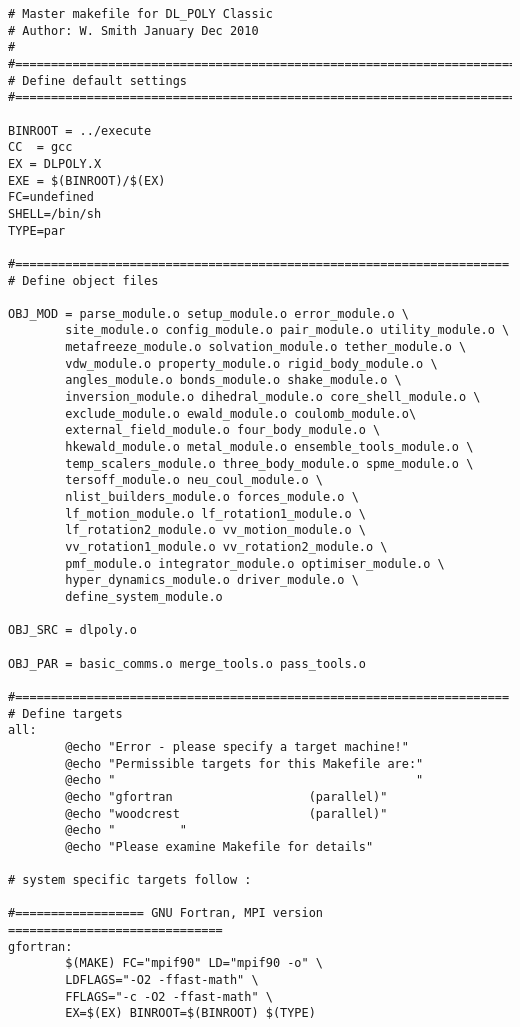 
\label{A1}
\begin{verbatim}
# Master makefile for DL_POLY Classic
# Author: W. Smith January Dec 2010
# 
#=======================================================================
# Define default settings
#=======================================================================

BINROOT = ../execute
CC  = gcc
EX = DLPOLY.X
EXE = $(BINROOT)/$(EX)
FC=undefined
SHELL=/bin/sh
TYPE=par

#=====================================================================
# Define object files

OBJ_MOD = parse_module.o setup_module.o error_module.o \
        site_module.o config_module.o pair_module.o utility_module.o \
        metafreeze_module.o solvation_module.o tether_module.o \
        vdw_module.o property_module.o rigid_body_module.o \
        angles_module.o bonds_module.o shake_module.o \
        inversion_module.o dihedral_module.o core_shell_module.o \
        exclude_module.o ewald_module.o coulomb_module.o\
        external_field_module.o four_body_module.o \
        hkewald_module.o metal_module.o ensemble_tools_module.o \
        temp_scalers_module.o three_body_module.o spme_module.o \
        tersoff_module.o neu_coul_module.o \
        nlist_builders_module.o forces_module.o \
        lf_motion_module.o lf_rotation1_module.o \
        lf_rotation2_module.o vv_motion_module.o \
        vv_rotation1_module.o vv_rotation2_module.o \
        pmf_module.o integrator_module.o optimiser_module.o \
        hyper_dynamics_module.o driver_module.o \
        define_system_module.o

OBJ_SRC = dlpoly.o

OBJ_PAR = basic_comms.o merge_tools.o pass_tools.o

#=====================================================================
# Define targets
all:
        @echo "Error - please specify a target machine!"
        @echo "Permissible targets for this Makefile are:"
        @echo "                                          "
        @echo "gfortran                   (parallel)"
        @echo "woodcrest                  (parallel)"
        @echo "         "
        @echo "Please examine Makefile for details"

# system specific targets follow :

#================== GNU Fortran, MPI version ==============================
gfortran:
        $(MAKE) FC="mpif90" LD="mpif90 -o" \
        LDFLAGS="-O2 -ffast-math" \
        FFLAGS="-c -O2 -ffast-math" \
        EX=$(EX) BINROOT=$(BINROOT) $(TYPE)


\end{verbatim}
